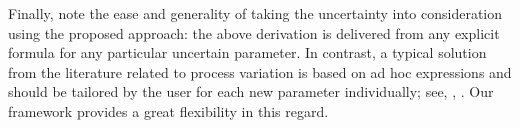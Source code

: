 Finally, note the ease and generality of taking the uncertainty into consideration using the proposed approach: the above derivation is delivered from any explicit formula for any particular uncertain parameter.
In contrast, a typical solution from the literature related to process variation is based on ad hoc expressions and should be tailored by the user for each new parameter individually; see, \eg, \cite{bhardwaj2008, ghanta2006}.
Our framework provides a great flexibility in this regard.
